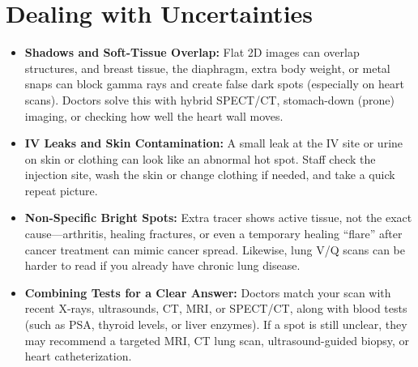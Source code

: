 \section{Dealing with Uncertainties}
\begin{itemize}
\item \textbf{Shadows and Soft-Tissue Overlap:} Flat 2D images can overlap structures, and breast tissue, the diaphragm, extra body weight, or metal snaps can block gamma rays and create false dark spots (especially on heart scans). Doctors solve this with hybrid SPECT/CT, stomach-down (prone) imaging, or checking how well the heart wall moves.
\item \textbf{IV Leaks and Skin Contamination:} A small leak at the IV site or urine on skin or clothing can look like an abnormal hot spot. Staff check the injection site, wash the skin or change clothing if needed, and take a quick repeat picture.
\item \textbf{Non-Specific Bright Spots:} Extra tracer shows active tissue, not the exact cause---arthritis, healing fractures, or even a temporary healing ``flare'' after cancer treatment can mimic cancer spread. Likewise, lung V/Q scans can be harder to read if you already have chronic lung disease.
\item \textbf{Combining Tests for a Clear Answer:} Doctors match your scan with recent X-rays, ultrasounds, CT, MRI, or SPECT/CT, along with blood tests (such as PSA, thyroid levels, or liver enzymes). If a spot is still unclear, they may recommend a targeted MRI, CT lung scan, ultrasound-guided biopsy, or heart catheterization.
\end{itemize}

